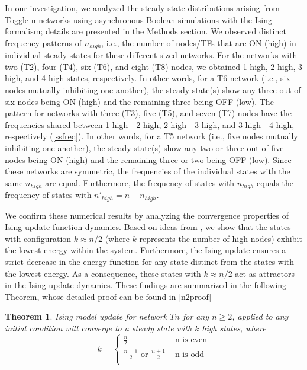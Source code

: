 \documentclass[11pt,a4paper]{article}
\newtheorem{theorem}{Theorem}
\theoremstyle{definition}
\theoremstyle{remark}
\begin{document}
In our investigation, we analyzed the steady-state distributions arising from Toggle-n networks using asynchronous Boolean simulations with the Ising formalism; details are presented in the Methods section. We observed distinct frequency patterns of $n_{high}$, i.e., the number of nodes/TFs that are ON (high) in individual steady states for these different-sized networks. For the networks with two (T2), four (T4), six (T6), and eight (T8) nodes, we obtained 1 high, 2 high, 3 high, and 4 high states, respectively. In other words, for a T6 network (i.e., six nodes mutually inhibiting one another), the steady state(s) show any three out of six nodes being ON (high) and the remaining three being OFF (low). The pattern for networks with three (T3), five (T5), and seven (T7) nodes have the frequencies shared between 1 high - 2 high, 2 high - 3 high, and 3 high - 4 high, respectively (\cref{ssfreq}). In other words, for a T5 network (i.e., five nodes mutually inhibiting one another), the steady state(s) show any two or three out of five nodes being ON (high) and the remaining three or two being OFF (low). Since these networks are symmetric, the frequencies of the individual states with the same $n_{high}$ are equal. Furthermore, the frequency of states with $n_{high}$ equals the frequency of states with $n'_{high} = n-n_{high}$.

We confirm these numerical results by analyzing the convergence properties of Ising update function dynamics. Based on ideas from \cite{font-clos_topography_2018}, we show that the states with configuration $k \approx n/2$ (where $k$ represents the number of high nodes) exhibit the lowest energy within the system. Furthermore, the Ising update ensures a strict decrease in the energy function for any state distinct from the states with the lowest energy. As a consequence, these states with $k\approx n/2$ act as attractors in the Ising update dynamics. These  findings are summarized in the following Theorem, whose detailed proof can be found in \cref{n2proof}

\begin{theorem}
Ising model update for network $Tn$ for any $n\geq 2$, applied to any initial condition will converge to a steady state with $k$ high states, where 
\[ 
k =  
    \begin{cases}
    \frac{n}{2} & \mbox{ n is even} \\
    \frac{n-1}{2} \mbox{ or } \frac{n+1}{2} & \mbox{ n is odd} \\
    \end{cases}\]
\label{n2thm}
\end{theorem}
\end{document}
